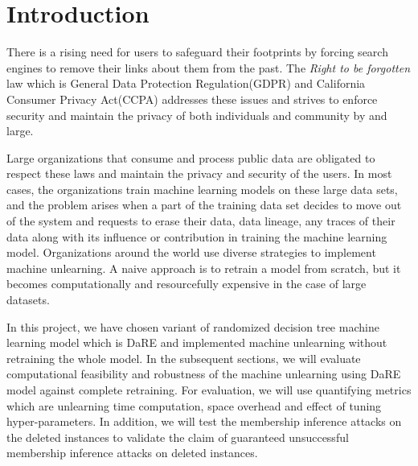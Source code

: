 \documentclass[11pt,letterpaper]{article}
\begin{document}
\section{Introduction}



There is a rising need for users to safeguard their footprints by forcing search engines to remove their links about them from the past. The  \emph{Right to be forgotten} law which is General Data Protection Regulation(GDPR) and  California Consumer Privacy Act(CCPA) addresses these issues and strives to enforce security and maintain the privacy of both individuals and community by and large.
\smallskip

Large organizations that consume and process public data are obligated to respect these laws and maintain the privacy and security of the users. In most cases, the organizations train machine learning models on these large data sets, and the problem arises when a part of the training data set decides to move out of the system and requests to erase their data, data lineage, any traces of their data along with its influence or contribution in training the machine learning model. Organizations around the world use diverse strategies to implement machine unlearning. A naive approach is to retrain a model from scratch, but it becomes computationally and resourcefully expensive in the case of large datasets.
\smallskip


In this project, we have chosen variant of randomized decision tree machine learning model which is DaRE and implemented machine unlearning without retraining the whole model. In the subsequent sections, we will evaluate computational feasibility and robustness of the machine unlearning using DaRE model against complete retraining. For evaluation, we will use quantifying metrics which are unlearning time computation, space overhead and effect of tuning hyper-parameters. In addition, we will test the membership inference attacks on the deleted instances to validate the claim of guaranteed unsuccessful membership inference attacks on deleted instances.
\end{document}
